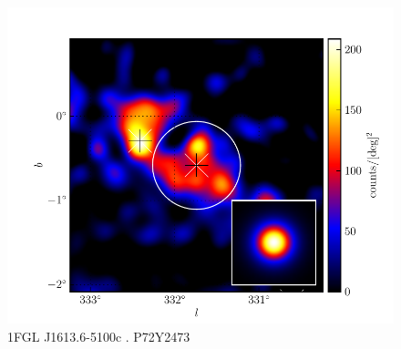 \documentclass[preprint]{aastex}
\begin{document}
  \begin{figure}
    \begin{center}
      \includegraphics[type=pdf,ext=.pdf,read=.pdf]{source_plots/source_1FGL_J1613.6-5100c}
    \end{center}
    \caption{
    1FGL J1613.6-5100c . P72Y2473}
  \end{figure}




  
\end{document}
